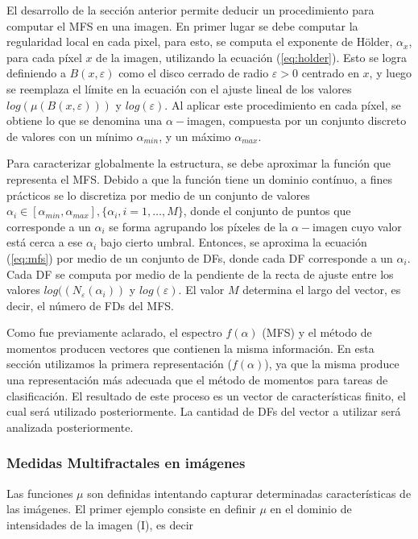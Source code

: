 El desarrollo de la sección anterior permite deducir un procedimiento para computar el MFS en una imagen.
En primer lugar se debe computar la regularidad local en cada pixel, para esto, se computa el exponente de H\"older, $\alpha_{x}$, para cada píxel $x$ de la imagen, utilizando la ecuación (\ref{eq:holder}).
Esto se logra definiendo a $B(x,\varepsilon)$ como el disco cerrado de radio $\varepsilon > 0$ centrado en $x$, y luego se reemplaza el límite en la ecuación con el ajuste lineal de los valores $log(\mu(B(x,\varepsilon)))$ y $log(\varepsilon)$.
Al aplicar este procedimiento en cada píxel, se obtiene lo que se denomina una $\alpha-$imagen, compuesta por un conjunto discreto de valores con un mínimo $\alpha_{min}$, y un máximo $\alpha_{max}$.

Para caracterizar globalmente la estructura, se debe aproximar la función que representa el MFS.
Debido a que la función tiene un dominio contínuo, a fines prácticos se lo discretiza por medio de un conjunto de valores $\alpha_{i} \in [\alpha_{min},\alpha_{max}], \{\alpha_{i}, i = 1,\dots,M\}$, donde el conjunto de puntos que corresponde a un $\alpha_{i}$ se forma agrupando los píxeles de la $\alpha-$imagen cuyo valor está cerca a ese $\alpha_{i}$ bajo cierto umbral. 
Entonces, se aproxima la ecuación (\ref{eq:mfs}) por medio de un conjunto de DFs, donde cada DF corresponde a un $\alpha_{i}$.
Cada DF se computa por medio de la pendiente de la recta de ajuste entre los valores $log((N_{\varepsilon}(\alpha_{i}))$ y $log(\varepsilon)$. 
El valor $M$ determina el largo del vector, es decir, el número de FDs del MFS.

Como fue previamente aclarado, el espectro $f(\alpha)$ (MFS) y el método de momentos producen vectores que contienen la misma información.
En esta sección utilizamos la primera representación ($f(\alpha)$), ya que la misma produce una representación más adecuada que el método de momentos para tareas de clasificación.
El resultado de este proceso es un vector de características finito, el cual será utilizado posteriormente.
La cantidad de DFs del vector a utilizar será analizada posteriormente.


\subsubsection{Medidas Multifractales en imágenes}
\label{sec:mfsmeasures}
Las funciones $\mu$ son definidas intentando capturar determinadas características de las imágenes.
El primer ejemplo consiste en definir $\mu$ en el dominio de intensidades de la imagen (I), es decir

